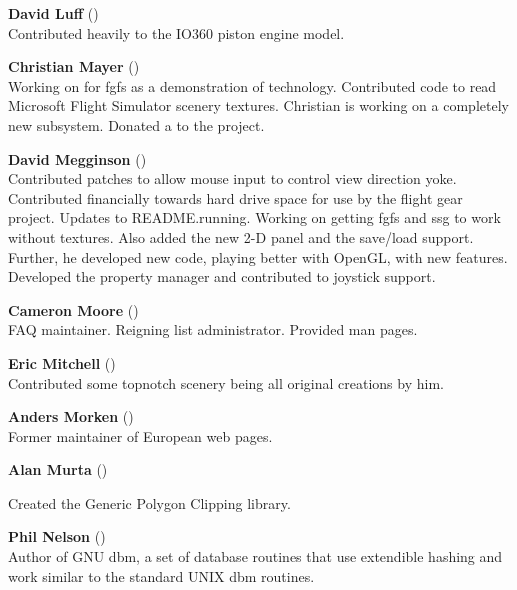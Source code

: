\noindent \textbf{David Luff} ()\\
 Contributed heavily to the IO360 piston engine model.
 \medskip

\noindent \textbf{Christian Mayer}
()\\
 Working on  for fgfs as a demonstration of technology.
 Contributed code to read Microsoft Flight Simulator scenery textures. Christian is working on a completely new  subsystem.
 Donated a  to the project.
 \medskip

\noindent \textbf{David Megginson} ()\\
  Contributed patches to allow mouse input to control view direction yoke.
  Contributed financially towards hard drive space for use by the
  flight gear project. Updates to README.running.
  Working on getting fgfs and ssg to work without textures.
  Also added the new 2-D panel and the save/load support.
  Further, he developed new  code, playing better with OpenGL, with new features.
  Developed the property manager and contributed to joystick support.
 \medskip

 \medskip

\noindent \textbf{Cameron Moore}
()\\
 FAQ maintainer. Reigning list administrator. Provided man pages.
 \medskip

\noindent \textbf{Eric Mitchell} ()\\
  Contributed some topnotch scenery  being all original creations by him.
 \medskip

\noindent \textbf{Anders Morken} ()\\
  Former maintainer of European web pages.
  \medskip

\noindent \textbf{Alan Murta} ()
 \medskip

  Created the Generic Polygon Clipping library.
 \medskip

   \medskip

\noindent \textbf{Phil Nelson} ()\\
  Author of GNU dbm, a set of database routines that use extendible hashing and work
  similar to the standard UNIX dbm routines.
  \medskip

